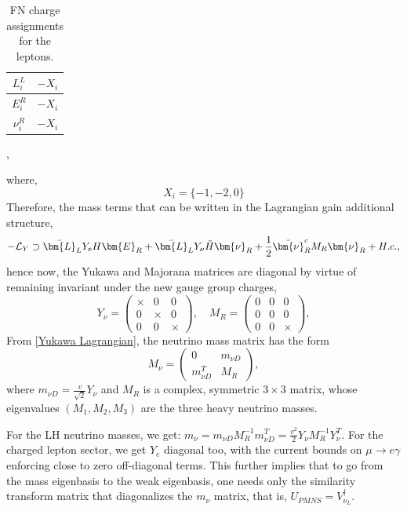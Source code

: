 \begin{table}[h]
\centering
\begin{tabular}{ | c | c | } 
  \hline
  $L^L_i$ & $-X_i$ \\ 
  \hline
  $E^R_i$ & $-X_i$ \\ 
  \hline
  $\nu^R_i$ & $-X_i$ \\ 
  \hline
\end{tabular},
\caption{FN charge assignments for the leptons.}
\label{Table 1}
\end{table}
where, 
\begin{equation}
    X_i = \{ -1,-2,0\}
\end{equation}
Therefore, the mass terms that can be written in the Lagrangian gain additional structure,
\begin{equation} \label{Yukawa Lagrangian}
    -\mathcal{L}_Y  \supset \Bar{\bm{L}}_L Y_e H \bm{E}_R +   \Bar{\bm{L}}_L Y_\nu \Tilde{H} \bm{\nu}_R + \frac{1}{2}  \Bar{\bm{\nu}}_R^c M_R \bm{\nu}_R + H.c.,
\end{equation}
hence now, the Yukawa and Majorana matrices are diagonal by virtue of remaining invariant under the new gauge group charges,
\begin{equation}
    Y_{\nu}  =   
    \begin{pmatrix}
    \times & 0 & 0 \\
    0 & \times & 0 \\
    0 & 0 & \times 
    \end{pmatrix}, \,\,\,\,\,\,
    M_R  =   
    \begin{pmatrix}
    0 & 0 & 0 \\
    0 & 0 & 0 \\
    0 & 0 & \times 
    \end{pmatrix},
\end{equation}
From \cref{Yukawa Lagrangian}, the neutrino mass matrix has the form
\begin{equation} \label{Full neutrino mass matrix}
    M_\nu = \begin{pmatrix}
        0 & m_{\nu D} \\ m_{\nu D}^T & M_R 
    \end{pmatrix},
\end{equation} 
where $m_{\nu D} = \frac{v}{\sqrt{2}} Y_\nu$ and $M_R$ is a complex, symmetric $3 \times 3$ matrix, whose eigenvalues $(M_1, M_2, M_3)$ are the three heavy neutrino masses.

For the LH neutrino masses, we get: $m_\nu = m_{\nu D} M_R^{-1}m_{\nu D}^T = \frac{v^2}{2} Y_{\nu} M_R^{-1}Y_{\nu}^T$. For the charged lepton sector, we get $Y_e$ diagonal too, with the current bounds on $\mu \rightarrow e \gamma$ \cite{navas_review_2024} enforcing close to zero off-diagonal terms. This further implies that to go from the mass eigenbasis to the weak eigenbasis, one needs only the similarity transform matrix that diagonalizes the $m_\nu$ matrix, that is, $U_{PMNS} = V^\dagger_{\nu_L}$.

